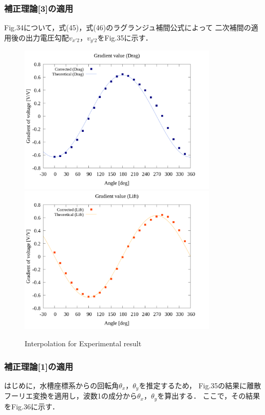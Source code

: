 \newpage

\subsubsection{補正理論[3]の適用}
Fig.34について，式(45)，式(46)のラグランジュ補間公式によって
二次補間の適用後の出力電圧勾配$v_{x'2}$，$v_{y'2}$をFig.35に示す．

\begin{figure}[htbp]
  \begin{center}
    \includegraphics[width=95mm]{../../02_workspace/result/2-ex/plot/21/21-3_interpolated_drag.png}
    \includegraphics[width=95mm]{../../02_workspace/result/2-ex/plot/21/21-3_interpolated_lift.png}
  \end{center}
  \caption{Interpolation for Experimental result}
\end{figure}

\newpage

\subsubsection{補正理論[1]の適用}
はじめに，水槽座標系からの回転角$\theta_x$，$\theta_y$を推定するため，
Fig.35の結果に離散フーリエ変換を適用し，波数1の成分から$\theta_x$，$\theta_y$を算出する．
ここで，その結果をFig.36に示す．

